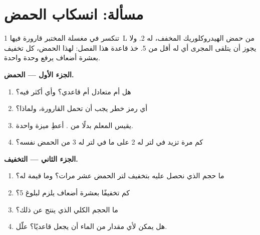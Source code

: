 \section{مسألة: انسكاب الحمض}

\begin{problem}
\label{pb:g9:acids-bases-ph:1}
تنكسر في مغسلة المختبر قارورة فيها \qty{1}{L} من حمض الهيدروكلوريك المخفف،
 له 2. ولا يجوز أن يتلقى المجرى أي   له أقل من 5. خذ قاعدة هذا
الفصل: لهذا الحمض، كل تخفيف بعشرة أضعاف يرفع  وحدة
واحدة.

\medskip
\noindent\textbf{الجزء الأول --- الحمض.}
\begin{enumerate}
  \item هل  أم متعادل أم قاعدي؟ وأي  أكثر فيه؟
  \item أي رمز خطر يجب أن تحمل القارورة، ولماذا؟
  \item يقيس المعلم   بدلًا من .
        أعطِ ميزة واحدة.
  \item كم مرة تزيد   في لتر  له 2 على ما في لتر  له 3
        من الحمض نفسه؟
\end{enumerate}

\medskip
\noindent\textbf{الجزء الثاني --- التخفيف.}
\begin{enumerate}[resume]
  \item ما حجم  الذي نحصل عليه بتخفيف لتر الحمض عشر مرات؟ وما
        قيمة  له؟
  \item كم تخفيفًا بعشرة أضعاف يلزم لبلوغ  5؟
  \item ما الحجم الكلي  الذي ينتج عن ذلك؟
  \item هل يمكن لأي مقدار من الماء أن يجعل  قاعديًا؟ علّل.
\end{enumerate}


\end{problem}
